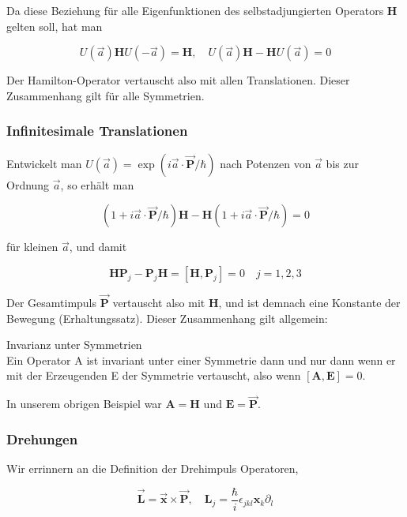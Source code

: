 \documentclass[10pt, letterpaper]{article}
\begin{document}
Da diese Beziehung für alle Eigenfunktionen des selbstadjungierten Operators $\mathbf{H}$ gelten soll, hat man

$$
U(\vec{a}) \mathbf{H} U(-\vec{a})=\mathbf{H}, \quad U(\vec{a}) \mathbf{H}-\mathbf{H} U(\vec{a})=0
$$

Der Hamilton-Operator vertauscht also mit allen Translationen. Dieser Zusammenhang gilt für alle Symmetrien.

\subsubsection*{Infinitesimale Translationen}
Entwickelt man $U(\vec{a})=\exp (i \vec{a} \cdot \overrightarrow{\mathbf{P}} / \hbar)$ nach Potenzen von $\vec{a}$ bis zur Ordnung $\vec{a}$, so erhält man

$$
(1+i \vec{a} \cdot \overrightarrow{\mathbf{P}} / \hbar) \mathbf{H}-\mathbf{H}(1+i \vec{a} \cdot \overrightarrow{\mathbf{P}} / \hbar)=0
$$

für kleinen $\vec{a}$, und damit

$$
\mathbf{H} \mathbf{P}_{j}-\mathbf{P}_{j} \mathbf{H}=\left[\mathbf{H}, \mathbf{P}_{j}\right]=0 \quad j=1,2,3
$$

Der Gesamtimpuls $\overrightarrow{\mathbf{P}}$ vertauscht also mit $\mathbf{H}$, und ist demnach eine Konstante der Bewegung (Erhaltungssatz). Dieser Zusammenhang gilt allgemein:

Invarianz unter Symmetrien\\
Ein Operator A ist invariant unter einer Symmetrie dann und nur dann wenn er mit der Erzeugenden E der Symmetrie vertauscht, also wenn $[\mathbf{A}, \mathbf{E}]=0$.

In unserem obrigen Beispiel war $\mathbf{A}=\mathbf{H}$ und $\mathbf{E}=\overrightarrow{\mathbf{P}}$.











\subsubsection*{Drehungen}
Wir errinnern an die Definition der Drehimpuls Operatoren,

$$
\overrightarrow{\mathbf{L}}=\overrightarrow{\mathbf{x}} \times \overrightarrow{\mathbf{P}}, \quad \mathbf{L}_{j}=\frac{\hbar}{i} \epsilon_{j k l} \mathbf{x}_{k} \partial_{l}
$$
\end{document}
